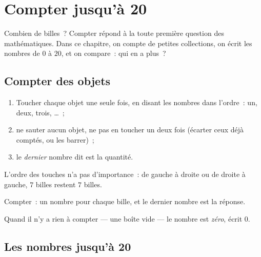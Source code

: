 \chapter{Compter jusqu'à 20}\label{ch:g1:counting}

Combien de billes~? Compter répond à la toute première question
des mathématiques. Dans ce chapitre, on compte de petites collections,
on écrit les nombres de $0$ à $20$, et on compare~: qui en a plus~?

\section{Compter des objets}

\begin{method}\label{met:g1:counting:how}
\begin{enumerate}
  \item Toucher chaque objet une seule fois, en disant les nombres dans
        l'ordre~: un, deux, trois, \dots~;
  \item ne sauter aucun objet, ne pas en toucher un deux fois (écarter
        ceux déjà comptés, ou les barrer)~;
  \item le \emph{dernier} nombre dit est la quantité.
\end{enumerate}
L'ordre des touches n'a pas d'importance~: de gauche à droite ou de
droite à gauche, $7$ billes restent $7$ billes.
\end{method}

\begin{omfigure}

{\small Compter~: un nombre pour chaque bille, et le dernier nombre
est la réponse.}
\end{omfigure}

\begin{definition}[Zéro]\label{def:g1:counting:zero}
Quand il n'y a rien à compter --- une boîte vide --- le nombre est
\emph{zéro}, écrit $0$.
\end{definition}

\section{Les nombres jusqu'à 20}

